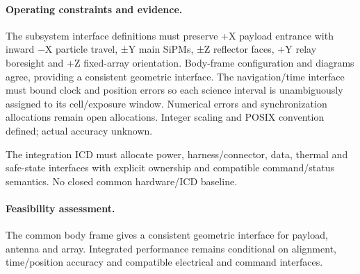 \paragraph{Operating constraints and evidence.} 
The subsystem interface definitions must preserve +X payload entrance with inward −X particle travel, ±Y main SiPMs, ±Z reflector faces, +Y relay boresight and +Z fixed-array orientation. Body-frame configuration and diagrams agree, providing a consistent geometric interface.
The navigation/time interface must bound clock and position errors so each science interval is unambiguously assigned to its cell/exposure window. Numerical errors and synchronization allocations remain open allocations. Integer scaling and POSIX convention defined; actual accuracy unknown.

The integration ICD must allocate power, harness/connector, data, thermal and safe-state interfaces with explicit ownership and compatible command/status semantics. No closed common hardware/ICD baseline.

\paragraph{Feasibility assessment.} The common body frame gives a consistent geometric interface for payload, antenna and array. Integrated performance remains conditional on alignment, time/position accuracy and compatible electrical and command interfaces.
